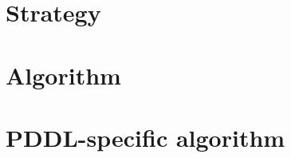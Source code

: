 \documentclass[Master.tex]{subfiles}
\begin{document}
	

\section{Strategy}\label{sec:Strategy}
    
\section{Algorithm}\label{sec:Algorithm}
    

%     
%
%     

\section{PDDL-specific algorithm}\label{sec:PDDLAlgo}
    
\end{document}
